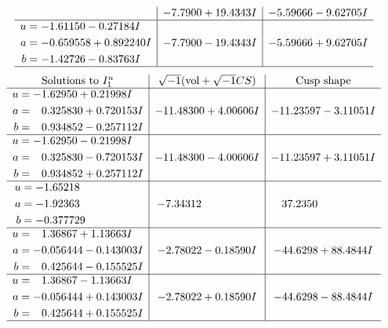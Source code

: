 \documentclass[1p]{elsarticle_modified}
\theoremstyle{definition}
\newcommand{\I}{\sqrt{-1}}
\begin{document}
$$\begin{array}{c|c|c}
 & -7.7900 + 19.4343 I & -5.59666 - 9.62705 I \\ \hline\begin{aligned}
u &= -1.61150 - 0.27184 I \\
a &= -0.659558 + 0.892240 I \\
b &= -1.42726 - 0.83763 I\end{aligned}
 & -7.7900 - 19.4343 I & -5.59666 + 9.62705 I\\
 \hline 
 \end{array}$$\newpage$$\begin{array}{c|c|c}  
\text{Solutions to }I^u_{1}& \I (\text{vol} + \sqrt{-1}CS) & \text{Cusp shape}\\
 \hline 
\begin{aligned}
u &= -1.62950 + 0.21998 I \\
a &= \phantom{-}0.325830 + 0.720153 I \\
b &= \phantom{-}0.934852 - 0.257112 I\end{aligned}
 & -11.48300 + 4.00606 I & -11.23597 - 3.11051 I \\ \hline\begin{aligned}
u &= -1.62950 - 0.21998 I \\
a &= \phantom{-}0.325830 - 0.720153 I \\
b &= \phantom{-}0.934852 + 0.257112 I\end{aligned}
 & -11.48300 - 4.00606 I & -11.23597 + 3.11051 I \\ \hline\begin{aligned}
u &= -1.65218\phantom{ +0.000000I} \\
a &= -1.92363\phantom{ +0.000000I} \\
b &= -0.377729\phantom{ +0.000000I}\end{aligned}
 & -7.34312\phantom{ +0.000000I} & \phantom{-}37.2350\phantom{ +0.000000I} \\ \hline\begin{aligned}
u &= \phantom{-}1.36867 + 1.13663 I \\
a &= -0.056444 - 0.143003 I \\
b &= \phantom{-}0.425644 - 0.155525 I\end{aligned}
 & -2.78022 - 0.18590 I & -44.6298 + 88.4844 I \\ \hline\begin{aligned}
u &= \phantom{-}1.36867 - 1.13663 I \\
a &= -0.056444 + 0.143003 I \\
b &= \phantom{-}0.425644 + 0.155525 I\end{aligned}
 & -2.78022 + 0.18590 I & -44.6298 - 88.4844 I\\
 \hline 
 \end{array}$$\newpage\newpage\renewcommand{\arraystretch}{1}
\end{document}
